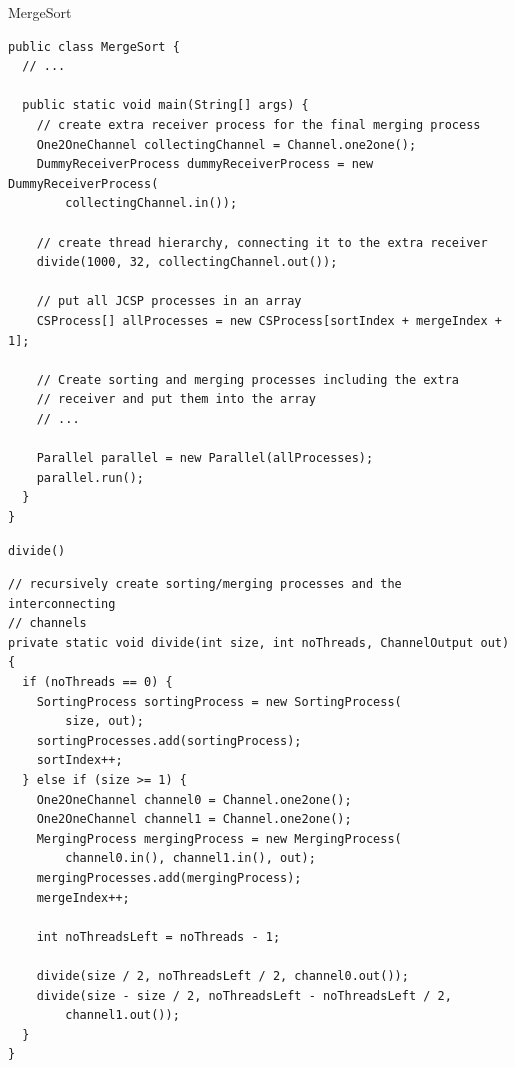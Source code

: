 \begin{frame}[fragile]{MergeSort}
\begin{lstlisting}[basicstyle=\fontsize{7}{9}\selectfont\ttfamily]
public class MergeSort {
  // ...

  public static void main(String[] args) {
    // create extra receiver process for the final merging process
    One2OneChannel collectingChannel = Channel.one2one();
    DummyReceiverProcess dummyReceiverProcess = new DummyReceiverProcess(
        collectingChannel.in());

    // create thread hierarchy, connecting it to the extra receiver
    divide(1000, 32, collectingChannel.out());

    // put all JCSP processes in an array
    CSProcess[] allProcesses = new CSProcess[sortIndex + mergeIndex + 1];

    // Create sorting and merging processes including the extra 
    // receiver and put them into the array
    // ...

    Parallel parallel = new Parallel(allProcesses);
    parallel.run();
  }
}
\end{lstlisting}
\end{frame}

\begin{frame}[fragile]{\lstinline!divide()!}
\begin{lstlisting}[basicstyle=\fontsize{7}{9}\selectfont\ttfamily]
// recursively create sorting/merging processes and the interconnecting
// channels
private static void divide(int size, int noThreads, ChannelOutput out) {
  if (noThreads == 0) {
    SortingProcess sortingProcess = new SortingProcess(
        size, out);
    sortingProcesses.add(sortingProcess);
    sortIndex++;
  } else if (size >= 1) {
    One2OneChannel channel0 = Channel.one2one();
    One2OneChannel channel1 = Channel.one2one();
    MergingProcess mergingProcess = new MergingProcess(
        channel0.in(), channel1.in(), out);
    mergingProcesses.add(mergingProcess);
    mergeIndex++;

    int noThreadsLeft = noThreads - 1;

    divide(size / 2, noThreadsLeft / 2, channel0.out());
    divide(size - size / 2, noThreadsLeft - noThreadsLeft / 2, 
        channel1.out());
  }
}
\end{lstlisting}  
\end{frame}


